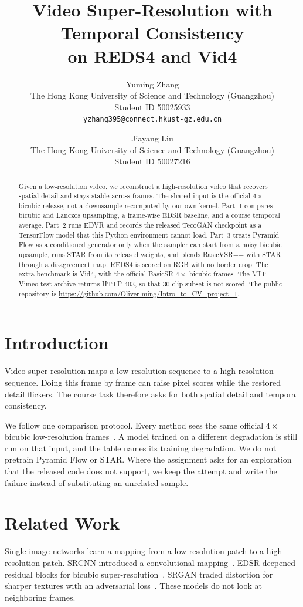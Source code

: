 \documentclass[10pt,twocolumn,letterpaper]{article}
\title{Video Super-Resolution with Temporal Consistency\\
on REDS4 and Vid4}
\author{Yuming Zhang\\
The Hong Kong University of Science and Technology (Guangzhou)\\
Student ID 50025933\\
{\tt\small yzhang395@connect.hkust-gz.edu.cn}
\and
Jiayang Liu\\
The Hong Kong University of Science and Technology (Guangzhou)\\
Student ID 50027216
}
\begin{document}
\maketitle

\begin{abstract}
Given a low-resolution video, we reconstruct a high-resolution video that recovers spatial detail and stays stable across frames.
The shared input is the official $4\times$ bicubic release, not a downsample recomputed by our own kernel.
Part~1 compares bicubic and Lanczos upsampling, a frame-wise EDSR baseline, and a course temporal average.
Part~2 runs EDVR and records the released TecoGAN checkpoint as a TensorFlow model that this Python environment cannot load.
Part~3 treats Pyramid Flow as a conditioned generator only when the sampler can start from a noisy bicubic upsample, runs STAR from its released weights, and blends BasicVSR++ with STAR through a disagreement map.
REDS4 is scored on RGB with no border crop.
The extra benchmark is Vid4, with the official BasicSR $4\times$ bicubic frames. The MIT Vimeo test archive returns HTTP 403, so that 30-clip subset is not scored.
The public repository is \url{https://github.com/Oliver-ming/Intro_to_CV_project_1}.
\end{abstract}

\section{Introduction}
Video super-resolution maps a low-resolution sequence to a high-resolution sequence.
Doing this frame by frame can raise pixel scores while the restored detail flickers.
The course task therefore asks for both spatial detail and temporal consistency.

We follow one comparison protocol.
Every method sees the same official $4\times$ bicubic low-resolution frames~\cite{nah2019reds,xue2019vimeo}.
A model trained on a different degradation is still run on that input, and the table names its training degradation.
We do not pretrain Pyramid Flow or STAR.
Where the assignment asks for an exploration that the released code does not support, we keep the attempt and write the failure instead of substituting an unrelated sample.

\section{Related Work}
Single-image networks learn a mapping from a low-resolution patch to a high-resolution patch.
SRCNN introduced a convolutional mapping~\cite{dong2015srcnn}.
EDSR deepened residual blocks for bicubic super-resolution~\cite{lim2017edsr}.
SRGAN traded distortion for sharper textures with an adversarial loss~\cite{ledig2017srgan}.
These models do not look at neighboring frames.
\end{document}
